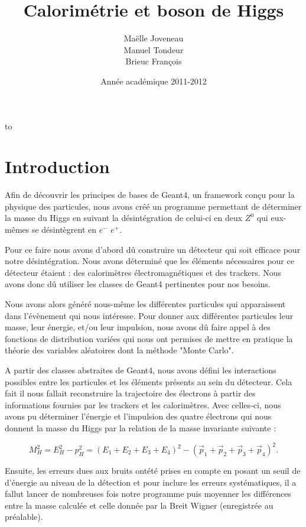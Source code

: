\documentclass[11pt]{article}
\title{Calorimétrie et boson de Higgs}
\author{ Maëlle Joveneau \\ Manuel Tondeur \\ Brieuc François }
\date{Année académique 2011-2012}
\makeatletter
\def\clap#1{\hbox to 0pt{\hss #1\hss}}%
\def\haut#1#2#3{%
\hbox to \hsize{%
\rlap{\vtop{\raggedright #1}}%
\hss
\clap{\vtop{\centering #2}}%
\hss
\llap{\vtop{\raggedleft #3}}}}%
\def\bas#1#2#3{%
\hbox to \hsize{%
\rlap{\vbox{\raggedright #1}}%
\hss
\clap{\vbox{\centering #2}}%
\hss
\llap{\vbox{\raggedleft #3}}}}%
\def\maketitle{%
\thispagestyle{empty}\vbox to \vsize{%
\haut{}{\@blurb}{}
\vfill
\vspace{1cm}
\begin{flushleft}
\usefont{OT1}{ptm}{m}{n}
\huge \@title
\end{flushleft}
\par
\hrule height 4pt
\par
\begin{flushright}
\usefont{OT1}{phv}{m}{n}
\Large \@author
\par
\end{flushright}
\vspace{1cm}
\vfill
\vfill
\bas{}{\@location, \@date}{}
}%
\cleardoublepage
}
\makeatother
\begin{document}
	\maketitle
		
	\tableofcontents

	\newpage
	
			\section{Introduction}
	Afin de d\'ecouvrir les principes de bases de Geant4, un framework conçu
pour la physique des particules, nous avons cr\'eé un programme permettant de
d\'eterminer la masse du Higgs en suivant la d\'esint\'egration de celui-ci en
deux $Z^0$ qui eux-m\^emes se d\'esint\`egrent en $e^-$ $e^+$.

Pour ce faire nous avons d'abord dû construire un d\'etecteur qui soit efficace
pour notre d\'esint\'egration. Nous avons d\'etermin\'e que les \'el\'ements
n\'ecessaires pour ce d\'etecteur \'etaient : des calorim\`etres
\'electromagn\'etiques et des trackers. Nous avons donc dû utiliser les classes
de Geant4 pertinentes pour nos besoins.
 
Nous avons alors g\'en\'er\'e nous-m\^eme les diff\'erentes particules qui
apparaissent dans l'\'ev\`enement qui nous int\'eresse. Pour donner aux
diff\'erentes particules leur masse, leur \'energie, et/ou leur impulsion, nous
avons dû faire appel \`a des fonctions de distribution vari\'ees qui nous ont
permises de mettre en pratique la th\'eorie des variables aléatoires dont la
méthode "Monte Carlo".
 
A partir des classes abstraites de Geant4, nous avons défini les interactions
possibles entre les particules et les \'el\'ements pr\'esents au sein du
d\'etecteur. Cela fait il nous fallait reconstruire la trajectoire des
\'electrons \`a partir des informations fournies par les trackers et les
calorim\`etres. Avec celles-ci, nous avons pu d\'eterminer l'\'energie et
l'impulsion des quatre \'electrons qui nous donnent la masse du Higgs par la
relation de la masse invariante suivante : 
 
\begin{equation}
M_H^2=E_H^2-p_H^2=(E_1+E_2+E_3+E_4)^2-(\vec{p}_1+\vec{p}_2+\vec{p}_3+\vec{p}_4)^2.
\end{equation} 
    
Ensuite, les erreurs dues aux bruits ont\'et\'e prises en compte en posant un seuil de d'\'energie au niveau de la 
d\'etection et pour inclure les erreurs syst\'ematiques, il a fallut lancer de nombreuses fois notre programme puis
moyenner les diff\'erences entre la masse calcul\'ee et celle donn\'ee par la Breit Wigner 
(enregistr\'ee au pr\'ealable). 
\end{document}
